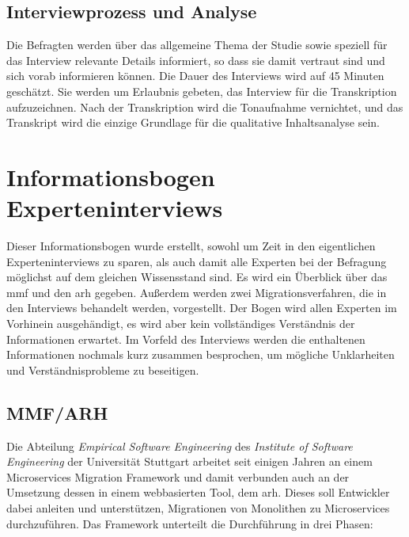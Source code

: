 \section{Interviewprozess und Analyse}
Die Befragten werden über das allgemeine Thema der Studie sowie speziell für das Interview relevante Details informiert, so dass sie damit vertraut sind und sich vorab informieren können.
Die Dauer des Interviews wird auf 45 Minuten geschätzt.
Sie werden um Erlaubnis gebeten, das Interview für die Transkription aufzuzeichnen.
Nach der Transkription wird die Tonaufnahme vernichtet, und das Transkript wird die einzige Grundlage für die qualitative Inhaltsanalyse sein.

\chapter{Informationsbogen Experteninterviews}
\label{chap:expert-interviews-infobogen}

Dieser Informationsbogen wurde erstellt, sowohl um Zeit in den eigentlichen Experteninterviews zu sparen, als auch damit alle Experten bei der Befragung möglichst auf dem gleichen Wissensstand sind.
Es wird ein Überblick über das \acrfull{mmf} und den \acrfull{arh} gegeben.
Außerdem werden zwei Migrationsverfahren, die in den Interviews behandelt werden, vorgestellt.
Der Bogen wird allen Experten im Vorhinein ausgehändigt, es wird aber kein vollständiges Verständnis der Informationen erwartet.
Im Vorfeld des Interviews werden die enthaltenen Informationen nochmals kurz zusammen besprochen, um mögliche Unklarheiten und Verständnisprobleme zu beseitigen.

\section{MMF/ARH}

Die Abteilung \emph{Empirical Software Engineering} des \emph{Institute of Software Engineering} der Universität Stuttgart arbeitet seit einigen Jahren an einem Microservices Migration Framework und damit verbunden auch an der Umsetzung dessen in einem webbasierten Tool, dem \gls{arh}.
Dieses soll Entwickler dabei anleiten und unterstützen, Migrationen von Monolithen zu Microservices durchzuführen.
Das Framework unterteilt die Durchführung in drei Phasen:

